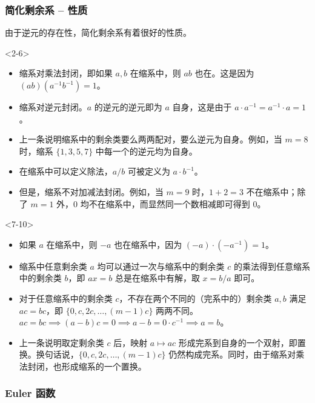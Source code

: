 \documentclass{../pkslide}
\begin{document}
\begin{frame}
  \frametitle{简化剩余系 -- 性质}
  由于逆元的存在性，简化剩余系有着很好的性质。
  
  \pause
  \begin{onlyenv}<2-6>
    \begin{itemize}
      \item 缩系对乘法封闭，即如果 $a, b$ 在缩系中，则 $a b$ 也在。这是因为 $(a b) (a^{-1} b^{-1}) = 1$。
        \pause
      \item 缩系对逆元封闭。$a$ 的逆元的逆元即为 $a$ 自身，这是由于 $a \cdot a^{-1} = a^{-1} \cdot a = 1$。
        \pause
      \item 上一条说明缩系中的剩余类要么两两配对，要么逆元为自身。例如，当 $m = 8$ 时，缩系 $\{ 1, 3, 5, 7 \}$ 中每一个的逆元均为自身。
        \pause
      \item 在缩系中可以定义除法，$a / b$ 可被定义为 $a \cdot b^{-1}$。
        \pause
      \item 但是，缩系不对加减法封闭。例如，当 $m = 9$ 时，$1 + 2 = 3$ 不在缩系中；除了 $m = 1$ 外，$0$ 均不在缩系中，而显然同一个数相减即可得到 $0$。
    \end{itemize}
  \end{onlyenv}
  
  \pause
  \begin{onlyenv}<7-10>
    \begin{itemize}
      \item 如果 $a$ 在缩系中，则 $-a$ 也在缩系中，因为 $(-a) \cdot (-a^{-1}) = 1$。
        \pause
      \item 缩系中任意剩余类 $a$ 均可以通过一次与缩系中的剩余类 $c$ 的乘法得到任意缩系中的剩余类 $b$，即 $a x = b$ 总是在缩系中有解，取 $x = b / a$ 即可。
        \pause
      \item 对于任意缩系中的剩余类 $c$，不存在两个不同的（完系中的）剩余类 $a, b$ 满足 $a c = b c$，即 $\{ 0, c, 2 c, \ldots, (m - 1) c \}$ 两两不同。$a c = b c \implies (a - b) c = 0 \implies a - b = 0 \cdot c^{-1} \implies a = b$。
        \pause
      \item 上一条说明取定剩余类 $c$ 后，映射 $a \mapsto a c$ 形成完系到自身的一个双射，即置换。换句话说，$\{ 0, c, 2 c, \ldots, (m - 1) c \}$ 仍然构成完系。同时，由于缩系对乘法封闭，也形成缩系的一个置换。
    \end{itemize}
  \end{onlyenv}
\end{frame}

\subsubsection{Euler 函数}
\end{document}
